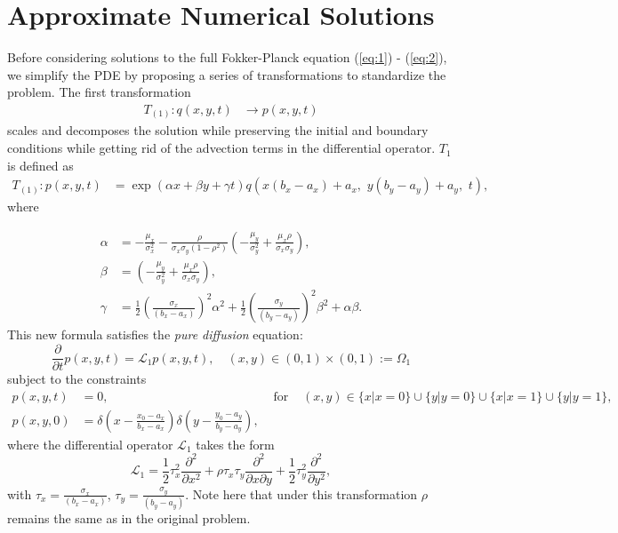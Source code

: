 \section{Approximate Numerical Solutions} \label{sec:approximate-sols}
Before considering solutions to the full Fokker-Planck equation
(\ref{eq:1}) - (\ref{eq:2}), we simplify the PDE by proposing a series
of transformations to standardize the problem. The first transformation
\begin{align}
  T_{(1)} : q(x,y,t) &\to p(x,y,t)
\end{align}
scales and decomposes the solution while preserving the initial and
boundary conditions while getting rid of the advection terms in the
differential operator. $T_1$ is defined as
\begin{align}
  T_{(1)}: p(x,y,t) &= \exp(\alpha x + \beta y + \gamma t) q\left( x(b_x - a_x) + a_x, \,\, y(b_y - a_y) + a_y, \,\, t \right), \label{eq:q-to-p}
\end{align}
where


\begin{align*}
  \alpha &= -\frac{\mu_x}{\sigma_x^2} - \frac{\rho}{\sigma_x\sigma_y(1-\rho^2)}\left( -\frac{\mu_y}{\sigma_y^2} + \frac{\mu_x \rho}{\sigma_x \sigma_y} \right), \\
  \beta &= \left( -\frac{\mu_y}{\sigma_y^2} + \frac{\mu_x \rho}{\sigma_x \sigma_y} \right), \\
  \gamma &= \frac{1}{2}\left( \frac{\sigma_x}{(b_x-a_x)} \right)^2 \alpha^2 + \frac{1}{2}\left(\frac{\sigma_y}{(b_y-a_y)}\right)^2 \beta^2 + \alpha\beta.
\end{align*}
This new formula satisfies the \textit{pure diffusion} equation:
\begin{equation}
  \frac{\partial}{\partial t} p(x,y,t) = \mathcal{L}_1 p(x,y,t),\quad (x,y) \in (0,1) \times (0,1) := \Omega_1 \label{eq:qq}
\end{equation}
subject to the constraints
\begin{align}
  p(x,y,t) &=0, & \mbox{ for } & (x,y) \in \{ x | x = 0\} \cup \{ y | y = 0\} \cup \{ x | x = 1\} \cup \{ y | y = 1\}, \nonumber \\
  p(x,y,0) &= \delta\left( x - \frac{x_0-a_x}{b_x - a_x} \right) \delta\left(y-\frac{y_0 - a_y}{b_y - a_y}\right), \nonumber
\end{align}
where the differential operator $\mathcal{L}_1$ takes the form
\[
  \mathcal{L}_1 = \frac{1}{2} \tau_x^2 \frac{\partial^2}{\partial x^2}
  + \rho\tau_x\tau_y \frac{\partial^2}{\partial x \partial y} + \frac{1}{2}\tau_y^2 \frac{\partial^2}{\partial y^2},
\]
with $\tau_x = \frac{\sigma_x}{(b_x-a_x)}$,
$\tau_y = \frac{\sigma_y}{(b_y-a_y)}$.  Note here that under this
transformation $\rho$ remains the same as in the original
problem.

